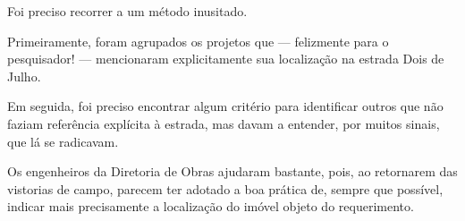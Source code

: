 Foi preciso recorrer a um método inusitado. 

Primeiramente, foram agrupados os projetos que --- felizmente para o pesquisador! --- mencionaram explicitamente sua localização na estrada Dois de Julho. 

Em seguida, foi preciso encontrar algum critério para identificar outros que não faziam referência explícita à estrada, mas davam a entender, por muitos sinais, que lá se radicavam. 

Os engenheiros da Diretoria de Obras ajudaram bastante, pois, ao retornarem das vistorias de campo, parecem ter adotado a boa prática de, sempre que possível, indicar mais precisamente a localização do imóvel objeto do requerimento. 

